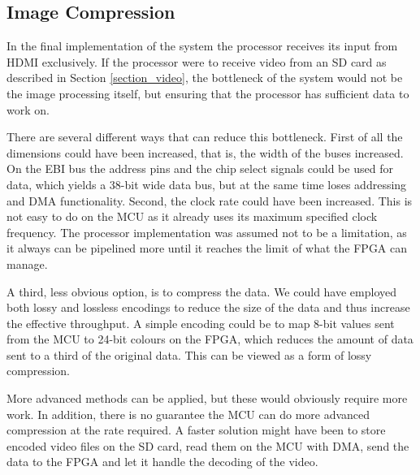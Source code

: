 \subsection{Image Compression}

In the final implementation of the system the processor receives its input from HDMI exclusively.
If the processor were to receive video from an SD card as described in Section \ref{section_video}, the bottleneck of the system would not be the image processing itself, but ensuring that the processor has sufficient data to work on.

There are several different ways that can reduce this bottleneck.
First of all the dimensions could have been increased, that is, the width of the buses increased.
On the EBI bus the address pins and the chip select signals could be used for data, which yields a 38-bit wide data bus, but at the same time loses addressing and DMA functionality.
Second, the clock rate could have been increased.
This is not easy to do on the MCU as it already uses its maximum specified clock frequency.
The processor implementation was assumed not to be a limitation, as it always can be pipelined more until it reaches the limit of what the FPGA can manage.

A third, less obvious option, is to compress the data.
We could have employed both lossy and lossless encodings to reduce the size of the data and thus increase the effective throughput.
A simple encoding could be to map 8-bit values sent from the MCU to 24-bit colours on the FPGA, which reduces the amount of data sent to a third of the original data.
This can be viewed as a form of lossy compression.

More advanced methods can be applied, but these would obviously require more work.
In addition, there is no guarantee the MCU can do more advanced compression at the rate required.
A faster solution might have been to store encoded video files on the SD card, read them on the MCU with DMA, send the data to the FPGA and let it handle the decoding of the video. 
